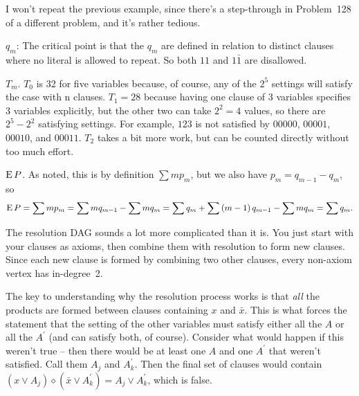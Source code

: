 I won't repeat the previous example, since there's a step-through in 
Problem~128 of a different problem, and it's rather tedious.

\vskip 0.01in 

\noindent [p 47] $q_m$: The critical point is that the $q_m$ are defined
in relation to distinct clauses where no literal is allowed to repeat.  So
both $11$ and $1 \bar 1$ are disallowed.

\noindent [p 48] $T_m$.  $T_0$ is 32 for five variables because, of course,
any of the $2^5$ settings will satisfy the case with n clauses.  $T_1 = 28$
because having one clause of 3 variables specifies 3 variables explicitly,
but the other two can take $2^2 = 4$ values, so there are $2^5 - 2^2$
satisfying settings.  For example, $123$ is not satisfied by $00000$,
$00001$, $00010$, and $00011$.  $T_2$ takes a bit more work, but
can be counted directly without too much effort.

\noindent [p 48] ${\rm E}\,P$.  As noted, this is by definition $\sum m p_m$,
but we also have $p_m = q_{m-1} - q_m$, so
$$
 {\rm E}\,P = \sum m p_m = \sum m q_{m-1} - \sum m q_m =
  \sum q_m + \sum \left(m - 1\right) q_{m - 1} - \sum m q_m = \sum q_m .
$$

\vskip 0.01in 

\noindent [p 54] The resolution DAG sounds a lot more complicated than it is.
You just start with your clauses as axioms, then combine them with resolution
to form new clauses.  Since each new clause is formed by combining two
other clauses, every non-axiom vertex has in-degree~2.

\vskip 0.01in 

\noindent [p 60] The key to understanding why the resolution process works
is that {\it all} the products are formed between clauses containing $x$ and $\bar x$.
This is what forces the statement that the setting of the other variables must
satisfy either all the $A$ or all the $A^{\prime}$ (and can satisfy both, of course).
Consider what would happen if this weren't true -- then there would be at least
one $A$ and one $A^{\prime}$ that weren't satisfied.  Call them $A_j$ and $A^{\prime}_k$.
Then the final set of clauses would contain 
$\left(x \vee A_j\right) \diamond \left(\bar x \vee A^{\prime}_k\right) = A_j \vee A^{\prime}_k$,
which is false.

\bye